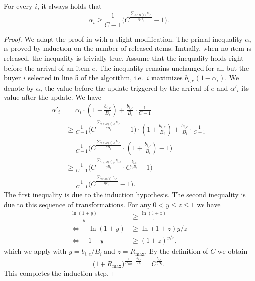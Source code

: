 \begin{lemma}	\label{lem:alpha}
For every $i$, it always holds that 
$$
\alpha_{i} \geq \frac{1}{C - 1} \biggl( C^{\frac{\sum_{e \in M(i)} b_{i,e}}{\eta B_{i}}} - 1 \biggr).
$$
\end{lemma}
%
\begin{proof}
We adapt the proof in \cite{BuchbinderNaor09:The-Design-of-Competitive} 
with a slight modification. 
The primal inequality $\alpha_i$ is proved by induction on the number of released items. 
Initially, when no item is released, the inequality  is trivially true. 
Assume that the inequality holds right before the arrival of an item $e$. 
The inequality remains unchanged for all but the buyer $i$ selected in line 5 of the algorithm, i.e.\ $i$ maximizes $b_{i,e} (1 - \alpha_{i})$. 
We denote by $\alpha_i$  the value before the update triggered by the arrival of $e$ and $\alpha'_i$ its value after the update.
We have
\begin{align*}
\alpha'_{i}
&= \alpha_{i} \cdot \left( 1 + \frac{b_{i,e}}{B_{i}} \right) 
										+  \frac{b_{i,e}}{B_{i}} \cdot \frac{1}{C - 1}	\\
%
&\geq \frac{1}{C - 1} \biggl( C^{\frac{\sum_{e' \in M(i) \setminus e } b_{i,e}}{\eta B_{i}}} - 1 \biggr)
			\cdot \left( 1 + \frac{b_{i,e}}{B_{i}} \right) 
										+   \frac{b_{i,e}}{B_{i}} \cdot \frac{1}{C - 1} \\
%
&=  \frac{1}{C - 1} \biggl( C^{\frac{\sum_{e' \in M(i) \setminus e } b_{i,e}}{\eta B_{i}}} 
						\cdot \left( 1 + \frac{b_{i,e}}{B_{i}} \right)  - 1 \biggr) 	\\						
%
&\geq  \frac{1}{C - 1} \biggl( C^{\frac{\sum_{e' \in M(i) \setminus e } b_{i,e}}{\eta B_{i}}} 
						\cdot  C^{\frac{b_{i,e} }{\eta B_{i}}}   - 1 \biggr) \\
%
&= \frac{1}{C - 1} \biggl( C^{\frac{\sum_{e \in M(i)} b_{i,e}}{\eta B_{i}}} - 1 \biggr).
\end{align*}
%
The first inequality is due to the induction hypothesis.
The second inequality is due to this sequence of transformations. 
For any $0 < y \leq z \leq 1$ we have
\begin{align*}
\frac{\ln(1+y)}{y} &\geq \frac{\ln(1+z)}{z} 
\\
\Leftrightarrow \quad \ln(1+y) &\geq \ln(1+z)y / z 
\\
\Leftrightarrow \quad 1+y &\geq (1+z)^{y/z},
\end{align*}
which we apply with $y=b_{i,e}/{B_i}$ and $z=R_{\max}$. By the definition of $C$ we obtain
$$
\biggl( 1+R_{\max} \biggr)^{\frac{1}{R_{\max}} \cdot \frac{b_{i,e} }{B_{i}}} 
= C^{\frac{b_{i,e}}{\eta B_{i}}}.
$$
This completes the induction step.
\end{proof}



